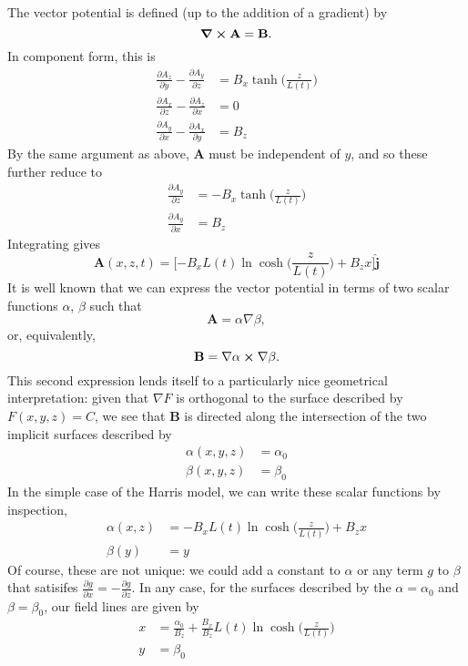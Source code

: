 \documentclass{article}
\begin{document}
	The vector potential is defined (up to the addition of a gradient) by
	\[
		\curl{\mathbf{A}} = \mathbf{B}.
	\]
	In component form, this is
	\begin{align*}
		\frac{\partial A_z}{\partial y} - \frac{\partial A_y}{\partial z} &= B_x\tanh\Big(\frac{z}{L(t)}\Big) \\
		\frac{\partial A_x}{\partial z} - \frac{\partial A_z}{\partial x} &= 0 \\
		\frac{\partial A_y}{\partial x} - \frac{\partial A_x}{\partial y} &= B_z
	\end{align*}
	By the same argument as above, $\mathbf{A}$ must be independent of $y$, and so these further reduce to
	\begin{align*}
		\frac{\partial A_y}{\partial z} &= -B_x\tanh\Big(\frac{z}{L(t)}\Big) \\
		\frac{\partial A_y}{\partial x} &= B_z 
	\end{align*}
	Integrating gives
	\[
		\mathbf{A}(x, z, t) = \Big[{-B_xL(t)}\ln\cosh\Big(\frac{z}{L(t)}\Big)+B_zx\Big]\hat{\mathbf{j}}
	\]
	It is well known that we can express the vector potential in terms of two scalar functions $\alpha$, $\beta$ such that
	\[
		\mathbf{A} = \alpha\nabla{\beta},
	\]
	or, equivalently,
	\[
		\mathbf{B} = \nabla{\alpha}\cross\nabla{\beta}.
	\]
	This second expression lends itself to a particularly nice geometrical interpretation: given that $\nabla F$ is orthogonal to the surface described by $F(x, y, z) = C$, we see that $\mathbf{B}$ is directed along the intersection of the two implicit surfaces described by
	\begin{align*}
		\alpha(x, y, z) &= \alpha_0 \\
		\beta(x, y, z) &= \beta_0
	\end{align*}
	In the simple case of the Harris model, we can write these scalar functions by inspection,
	\begin{align*}
		\alpha(x, z) &= -B_xL(t)\ln\cosh\Big(\frac{z}{L(t)}\Big) + B_zx \\
		\beta(y) &= y
	\end{align*}
	Of course, these are not unique: we could add a constant to $\alpha$ or any term $g$ to $\beta$ that satisifes $\frac{\partial g}{\partial x} = -\frac{\partial g}{\partial z}$. In any case, for the surfaces described by the $\alpha = \alpha_0$ and $\beta = \beta_0$, our field lines are given by
	\begin{align*}
		x &= \frac{\alpha_0}{B_z} + \frac{B_x}{B_z}L(t)\ln\cosh\Big(\frac{z}{L(t)}\Big) \\
		y &= \beta_0
	\end{align*}
	
\end{document}
